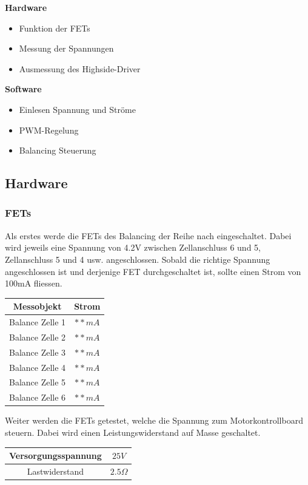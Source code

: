 \textbf{Hardware}
\begin{itemize}
	\item Funktion der FETs
	\item Messung der Spannungen
	\item Ausmessung des Highside-Driver
\end{itemize}
\textbf{Software}
\begin{itemize}
	\item Einlesen Spannung und Ströme
	\item PWM-Regelung
	\item Balancing Steuerung
\end{itemize}

\subsection*{Hardware}
\subsubsection*{FETs}
Als erstes werde die FETs des Balancing der Reihe nach eingeschaltet. Dabei wird jeweils eine Spannung von 4.2V zwischen Zellanschluss 6 und 5, Zellanschluss 5 und 4 usw. angeschlossen. Sobald die richtige Spannung angeschlossen ist und derjenige FET durchgeschaltet ist, sollte einen Strom von 100mA fliessen. 

\begin{center}
	\begin{tabular}{|c|c|}
		\hline 
		Messobjekt & Strom \\ \hline
		Balance Zelle 1 & $**mA$ \\ \hline
		Balance Zelle 2 & $**mA$ \\ \hline
		Balance Zelle 3 & $**mA$ \\ \hline
		Balance Zelle 4 & $**mA$ \\ \hline
		Balance Zelle 5 & $**mA$ \\ \hline
		Balance Zelle 6 & $**mA$ \\ \hline
	\end{tabular} 
	\label{tab:StromBalancing}
\end{center}

Weiter werden die FETs getestet, welche die Spannung zum Motorkontrollboard steuern. Dabei wird einen Leistungswiderstand auf Masse geschaltet. 

\begin{center}
	\begin{tabular}{|c|c|}
		\hline 
		Versorgungsspannung & $25V$ \\ \hline
		Lastwiderstand & $2.5\Omega$ \\ \hline
	\end{tabular} 
	\label{tab:fetmessbedzumotorcontrol}
\end{center}

